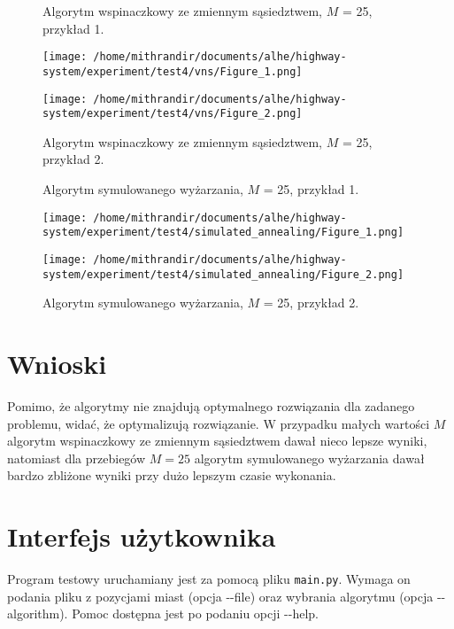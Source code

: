\documentclass{article}
\begin{document}
\begin{figure}[h]
	\caption{Algorytm wspinaczkowy ze zmiennym sąsiedztwem, $M$ = 25, przykład 1.}
	\texttt{[image: /home/mithrandir/documents/alhe/highway-system/experiment/test4/vns/Figure\_1.png]}
	
	\caption{Algorytm wspinaczkowy ze zmiennym sąsiedztwem, $M$ = 25, przykład 2.}
	\texttt{[image: /home/mithrandir/documents/alhe/highway-system/experiment/test4/vns/Figure\_2.png]}
\end{figure}

\begin{figure}[h]
	\caption{Algorytm symulowanego wyżarzania, $M$ = 25, przykład 1.}
	\texttt{[image: /home/mithrandir/documents/alhe/highway-system/experiment/test4/simulated\_annealing/Figure\_1.png]}
	
	\caption{Algorytm symulowanego wyżarzania, $M$ = 25, przykład 2.}
	\texttt{[image: /home/mithrandir/documents/alhe/highway-system/experiment/test4/simulated\_annealing/Figure\_2.png]}
\end{figure}
\clearpage

\section{Wnioski}
Pomimo, że algorytmy nie znajdują optymalnego rozwiązania dla zadanego problemu, widać, że optymalizują rozwiązanie.
W przypadku małych wartości $M$ algorytm wspinaczkowy ze zmiennym sąsiedztwem dawał nieco lepsze wyniki, natomiast dla przebiegów $M = 25$ algorytm symulowanego wyżarzania dawał bardzo zbliżone wyniki przy dużo lepszym czasie wykonania.

\section{Interfejs użytkownika}
Program testowy uruchamiany jest za pomocą pliku \texttt{main.py}. Wymaga on podania pliku z pozycjami miast (opcja -{}-file) oraz wybrania algorytmu (opcja -{}-algorithm).
Pomoc dostępna jest po podaniu opcji -{}-help. 
\end{document}

